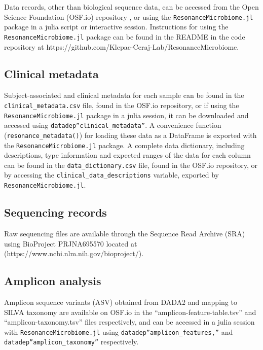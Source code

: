 \documentclass[fleqn,10pt]{wlscirep}
\begin{document}

Data records, other than biological sequence data, can be accessed from the Open Science Foundation (OSF.io) repository \cite{Bonham2021-zy},
or using the \verb|ResonanceMicrobiome.jl| package in a julia script or interactive session.
Instructions for using the \verb|ResonanceMicrobiome.jl| package can be found in the README in the code repository at https://github.com/Klepac-Ceraj-Lab/ResonanceMicrobiome.

\subsection*{Clinical metadata}

Subject-associated and clinical metadata for each sample can be found in the \verb|clinical_metadata.csv| file,
found in the OSF.io repository, or if using the \verb|ResonanceMicrobiome.jl| package in a julia session,
it can be downloaded and accessed using \verb|datadep”clinical_metadata”|.
A convenience function (\verb|resonance_metadata()|) for loading these data as a DataFrame
is exported with the \verb|ResonanceMicrobiome.jl| package.
A complete data dictionary, including descriptions, type information and expected ranges of the data for each column
can be found in the \verb|data_dictionary.csv| file, found in the OSF.io repository,
or by accessing the \verb|clinical_data_descriptions| variable, exported by \verb|ResonanceMicrobiome.jl|.

\subsection*{Sequencing records}

Raw sequencing files are available through the Sequence Read Archive (SRA) using BioProject PRJNA695570
located at (https://www.ncbi.nlm.nih.gov/bioproject/).

\subsection*{Amplicon analysis}

Amplicon sequence variants (ASV) obtained from DADA2 and mapping to SILVA taxonomy are available on OSF.io
in the “amplicon-feature-table.tsv” and “amplicon-taxonomy.tsv” files respectively,
and can be accessed in a julia session with \verb|ResonanceMicrobiome.jl| using \verb|datadep”amplicon_features,”|
and \verb|datadep”amplicon_taxonomy”| respectively.
\end{document}
